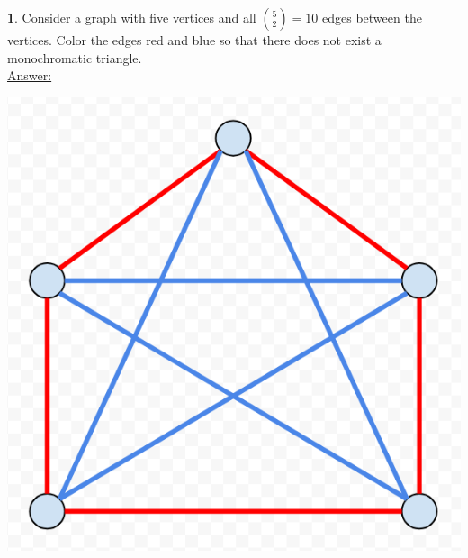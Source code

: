 \documentclass[12pt,a4paper]{article}
\theoremstyle{definition}
\newtheorem{problem}{}
\begin{document}
\begin{problem}
Consider a graph with five vertices and all $\binom{5}{2} = 10$ edges between the vertices. Color the edges red and blue so that there does not exist a monochromatic triangle. \\

\underline{Answer:} \\
\centerline{\includegraphics[scale=0.4]{q4.png}}

\end{problem}
\end{document}

